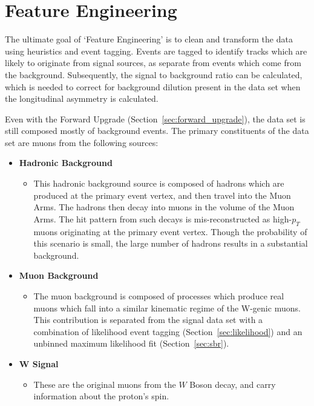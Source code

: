 \chapter{Feature Engineering}
\label{ch:feature_engineering}
The ultimate goal of `Feature Engineering' is to clean and transform the data
using heuristics and event tagging. Events are tagged to identify tracks which
are likely to originate from signal sources, as separate from events which come
from the background. Subsequently, the signal to background ratio can be
calculated, which is needed to correct for background dilution present in the
data set when the longitudinal asymmetry is calculated. 

Even with the Forward Upgrade (Section~\ref{sec:forward_upgrade}), the data set
is still composed mostly of background events. The primary constituents of the
data set are muons from the following sources:

\begin{itemize}
  \item \textbf{Hadronic Background}
    \begin{itemize}
      \item This hadronic background source is composed of hadrons which are
        produced at the primary event vertex, and then travel into the Muon
        Arms. The hadrons then decay into muons in the volume of the Muon Arms.
        The hit pattern from such decays is mis-reconstructed as high-$p_T$
        muons originating at the primary event vertex. Though the probability of
        this scenario is small, the large number of hadrons results in a
        substantial background. 
    \end{itemize}
  \item \textbf{Muon Background}
    \begin{itemize}
        \item The muon background is composed of processes which produce real
          muons which fall into a similar kinematic regime of the W-genic muons.
          This contribution is separated from the signal data set with a
          combination of likelihood event tagging (Section~\ref{sec:likelihood})
          and an unbinned maximum likelihood fit (Section~\ref{sec:sbr}).
    \end{itemize}
  \item \textbf{W Signal}
    \begin{itemize}
        \item These are the original muons from the $W$ Boson decay, and carry
          information about the proton's spin.
    \end{itemize}
\end{itemize}

